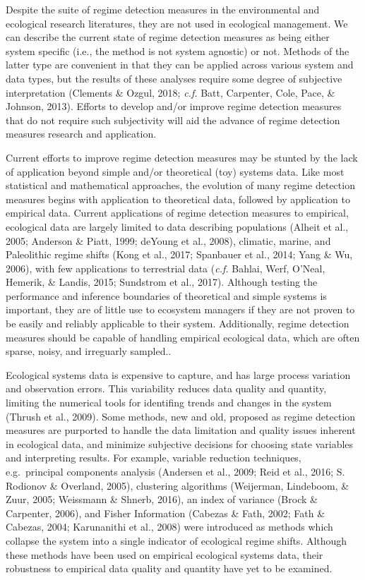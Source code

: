 \documentclass[12pt,twoside,openany]{reedthesis}
\begin{document}
Despite the suite of regime detection measures in the environmental and ecological research literatures, they are not used in ecological management. We can describe the current state of regime detection measures as being either system specific (i.e., the method is not system agnostic) or not. Methods of the latter type are convenient in that they can be applied across various system and data types, but the results of these analyses require some degree of subjective interpretation (Clements \& Ozgul, 2018; \emph{c.f.} Batt, Carpenter, Cole, Pace, \& Johnson, 2013). Efforts to develop and/or improve regime detection measures that do not require such subjectivity will aid the advance of regime detection measures research and application.

Current efforts to improve regime detection measures may be stunted by the lack of application beyond simple and/or theoretical (toy) systems data. Like most statistical and mathematical approaches, the evolution of many regime detection measures begins with application to theoretical data, followed by application to empirical data. Current applications of regime detection measures to empirical, ecological data are largely limited to data describing populations (Alheit et al., 2005; Anderson \& Piatt, 1999; deYoung et al., 2008), climatic, marine, and Paleolithic regime shifts (Kong et al., 2017; Spanbauer et al., 2014; Yang \& Wu, 2006), with few applications to terrestrial data (\emph{c.f.} Bahlai, Werf, O'Neal, Hemerik, \& Landis, 2015; Sundstrom et al., 2017). Although testing the performance and inference boundaries of theoretical and simple systems is important, they are of little use to ecosystem managers if they are not proven to be easily and reliably applicable to their system. Additionally, regime detection measures should be capable of handling empirical ecological data, which are often sparse, noisy, and irreguarly sampled..

Ecological systems data is expensive to capture, and has large process variation and observation errors. This variability reduces data quality and quantity, limiting the numerical tools for identifing trends and changes in the system (Thrush et al., 2009). Some methods, new and old, proposed as regime detection measures are purported to handle the data limitation and quality issues inherent in ecological data, and minimize subjective decisions for choosing state variables and interpreting results. For example, variable reduction techniques, e.g.~principal components analysis (Andersen et al., 2009; Reid et al., 2016; S. Rodionov \& Overland, 2005), clustering algorithms (Weijerman, Lindeboom, \& Zuur, 2005; Weissmann \& Shnerb, 2016), an index of variance (Brock \& Carpenter, 2006), and Fisher Information (Cabezas \& Fath, 2002; Fath \& Cabezas, 2004; Karunanithi et al., 2008) were introduced as methods which collapse the system into a single indicator of ecological regime shifts. Although these methods have been used on empirical ecological systems data, their robustness to empirical data quality and quantity have yet to be examined.
\end{document}
